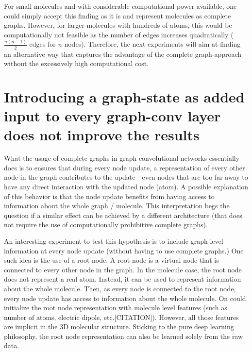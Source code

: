 For small molecules and with considerable computational power available, one could simply accept this finding as it is and represent molecules as complete graphs. However, for larger molecules with hundreds of atoms, this would be computationally not feasible as the number of edges increases quadratically ($\frac{n(n - 1)}{2}$ edges for $n$ nodes). Therefore, the next experiments will aim at finding an alternative way that captures the advantage of the complete graph-approach without the excessively high computational cost.



\section{Introducing a graph-state as added input to every graph-conv layer does not improve the results}


What the usage of complete graphs in graph convolutional networks essentially does is to ensures that during every node update, a representation of every other node in the graph contributes to the update - even nodes that are too far away to have any direct interaction with the updated node (atom).
A possible explanation of this behavior is that the node update benefits from having access to information about the whole graph / molecule. This interpretation begs the question if a similar effect can be achieved by a different architecture (that does not require the use of computationally prohibitive complete graphs).

An interesting experiment to test this hypothesis is to include graph-level information at every node update (without having to use complete graphs.) One such idea is the use of a root node. A root node is a virtual node that is connected to every other node in the graph. In the molecule case, the root node does not represent a real atom. Instead, it can be used to represent information about the whole molecule. Then, as every node is connected to the root node, every node update has access to information about the whole molecule. On could initialize the root node representation with molecule level features (such as number of atoms, electric dipole, etc.[CITATION]). However, all those features are implicit in the 3D molecular structure. Sticking to the pure deep learning philosophy, the root node representation can also be learned solely from the raw data.


